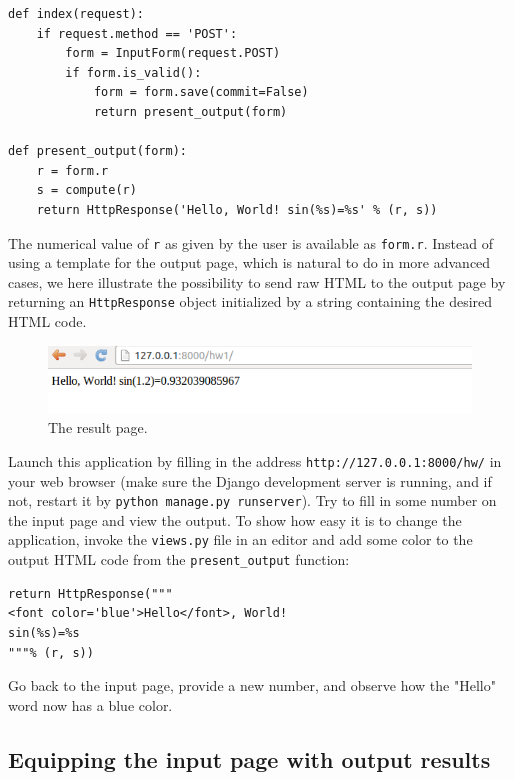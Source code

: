 \documentclass[%
oneside,                 %
final,                   %
10pt]{article}
\begin{document}
{\begin{Verbatim}[numbers=none,fontsize=\fontsize{9pt}{9pt},baselinestretch=0.85]
def index(request):
    if request.method == 'POST':
        form = InputForm(request.POST)
        if form.is_valid():
            form = form.save(commit=False)
            return present_output(form)

def present_output(form):
    r = form.r
    s = compute(r)
    return HttpResponse('Hello, World! sin(%s)=%s' % (r, s))
\end{Verbatim}
The numerical value of \Verb!r! as given by the user is available as \Verb!form.r!.
Instead of using a template for the output page, which is natural to
do in more advanced cases, we here illustrate the possibility to
send raw HTML to the output page by returning an \Verb!HttpResponse!
object initialized by a string containing the desired HTML code.


\begin{figure}[ht]
  \centerline{\includegraphics[width=0.9\linewidth]{fig-web4sa/hw1_django_output.png}}
  \caption{
  The result page. \label{wf:hw1:django:fig:result}
  }
\end{figure}


Launch this application by filling in the address \Verb!http://127.0.0.1:8000/hw/!
in your web browser (make sure the Django development server is running,
and if not, restart it by \Verb!python manage.py runserver!). Try to fill
in some number on the input page and view the output.
To show how easy it is to change the application, invoke the \Verb!views.py!
file in an editor and add some color to the output HTML code from
the \Verb!present_output! function:

\begin{Verbatim}[numbers=none,fontsize=\fontsize{9pt}{9pt},baselinestretch=0.85]
    return HttpResponse("""
<font color='blue'>Hello</font>, World!
sin(%s)=%s
"""% (r, s))
\end{Verbatim}
Go back to the input page, provide a new number, and observe how
the "Hello" word now has a blue color.


\subsection{Equipping the input page with output results}



}
\end{document}
